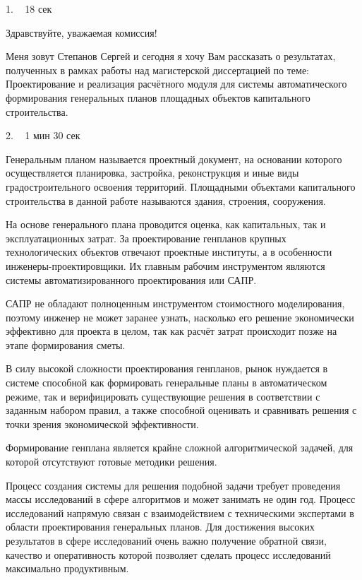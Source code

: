 \documentclass[a4paper,14pt]{extarticle}
\begin{document}
    1. ~ 18 сек

    Здравствуйте, уважаемая комиссия!

    Меня зовут Степанов Сергей и сегодня я хочу Вам рассказать о результатах,
    полученных в рамках работы над магистерской диссертацией по теме:
    Проектирование и реализация расчётного модуля для системы автоматического формирования
    генеральных планов площадных объектов капитального строительства.


    2. ~ 1 мин 30 сек

    Генеральным планом называется
    проектный документ, на основании которого осуществляется планировка,
    застройка, реконструкция и иные виды градостроительного освоения территорий.
    Площадными объектами капитального строительства в данной работе называются здания, строения, сооружения.

    На основе генерального плана проводится оценка, как капитальных, так и эксплуатационных затрат.
    За проектирование генпланов крупных технологических объектов отвечают проектные институты,
    а в особенности инженеры-проектировщики. Их главным рабочим инструментом
    являются системы автоматизированного проектирования или САПР.

    САПР не обладают полноценным инструментом стоимостного моделирования,
    поэтому инженер не может заранее узнать,
    насколько его решение экономически эффективно для проекта в целом,
    так как расчёт затрат происходит позже на этапе формирования сметы.

    В силу высокой сложности проектирования генпланов,
    рынок нуждается в системе способной как формировать генеральные планы в автоматическом режиме,
    так и верифицировать существующие решения в соответствии с заданным набором правил,
    а также способной оценивать и сравнивать решения с точки зрения экономической эффективности.

    Формирование генплана является крайне сложной алгоритмической задачей,
    для которой отсутствуют готовые методики решения.

    Процесс создания системы для решения подобной задачи требует
    проведения массы исследований в сфере алгоритмов и может занимать не один год.
    Процесс исследований напрямую связан с взаимодействием с техническими экспертами
    в области проектирования генеральных планов.
    Для достижения высоких результатов в сфере исследований очень важно получение обратной связи,
    качество и оперативность которой позволяет сделать процесс исследований максимально продуктивным.
\end{document}

